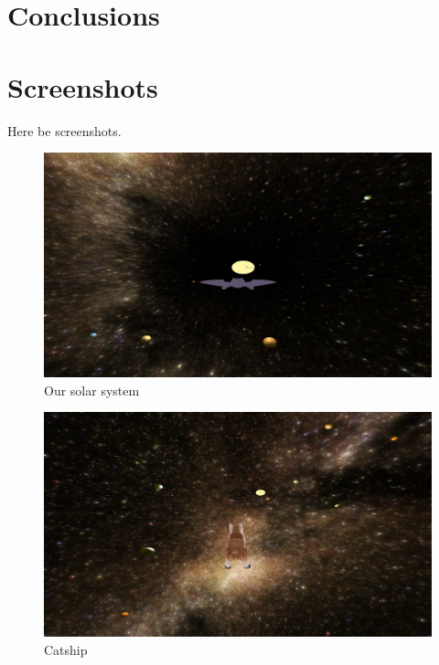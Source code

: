 \documentclass[a4paper,12pt]{article}
\begin{document}
\section{Conclusions}

\section{Screenshots}
Here be screenshots.
\begin{figure}[h!]
        \centering
        \centerline{\includegraphics[width=1.2\textwidth]{bild/our.png}}
        \caption{Our solar system}
        \label{fig:our}
\end{figure}
\begin{figure}[h!]
        \centering
        \centerline{\includegraphics[width=1.2\textwidth]{bild/cat.png}}
        \caption{Catship}
        \label{fig:cat}
\end{figure}
\end{document}
